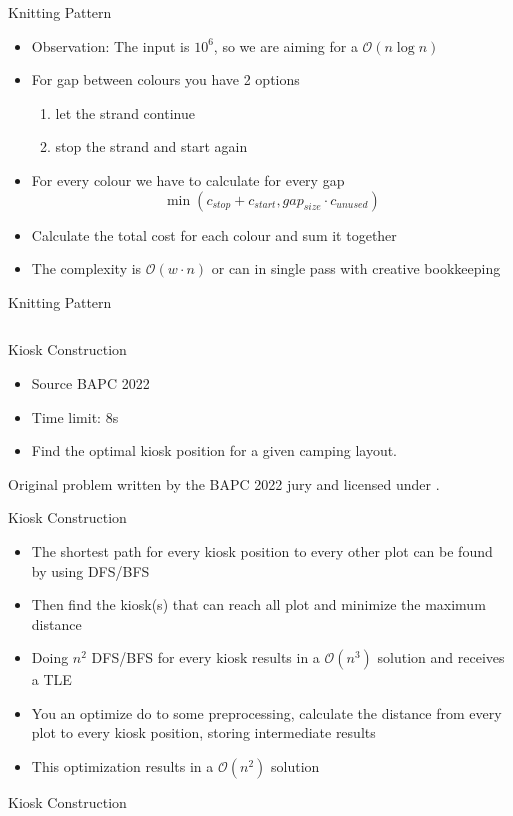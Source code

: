 \documentclass[11pt,pdf, aspectratio=169]{beamer}
\begin{document}
  \begin{frame}{Knitting Pattern}
    \begin{itemize}
      \item Observation: The input is $10^6$, so we are aiming for a $\mathcal{O}(n\log{}n)$
      \item For gap between colours you have 2 options
      \begin{enumerate}
        \item let the strand continue
        \item stop the strand and start again
      \end{enumerate}
      \item For every colour we have to calculate for every gap \[\min(c_{stop}+c_{start}, gap_{size}\cdot c_{unused})\]
      \item Calculate the total cost for each colour and sum it together
      \item The complexity is $\mathcal{O}(w\cdot n)$ or can in single pass with creative bookkeeping
    \end{itemize}
  \end{frame}
  \begin{frame}[containsverbatim]{Knitting Pattern}
    \inputminted{python}{code/session-1/python/dapc-k.py}
  \end{frame}

  \begin{frame}{Kiosk Construction}
    \begin{itemize}
      \item Source BAPC 2022
      \item Time limit: 8s
      \item Find the optimal kiosk position for a given camping layout.
    \end{itemize}
    Original problem written by the BAPC 2022 jury and licensed under \doclicenseLongNameRef.

    \doclicenseImage
  \end{frame}
  \begin{frame}{Kiosk Construction}
    \begin{itemize}
      \item The shortest path for every kiosk position to every other plot can be found by using DFS/BFS
      \item Then find the kiosk(s) that can reach all plot and minimize the maximum distance
      \item Doing $n^2$ DFS/BFS for every kiosk results in a $\mathcal{O}(n^3)$ solution and receives a TLE
      \item You an optimize do to some preprocessing, calculate the distance from every plot to every kiosk position, storing intermediate results
      \item This optimization results in a $\mathcal{O}(n^2)$ solution
    \end{itemize}
  \end{frame}
  \begin{frame}[containsverbatim]{Kiosk Construction}
    \inputminted[fontsize=\tiny]{python}{code/session-1/python/bapc-k.py}
  \end{frame}
\end{document}
